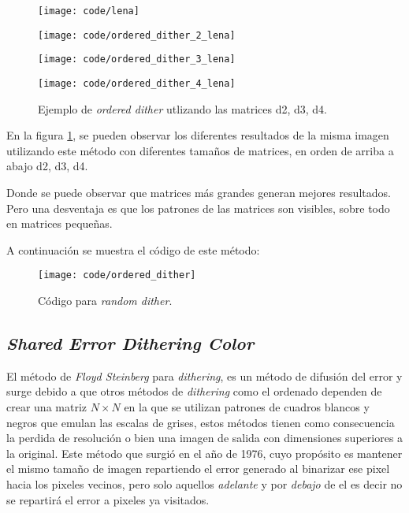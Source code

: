 \documentclass[conference]{IEEEtran}
\begin{document}
\begin{figure}[htbp]
\centerline{\texttt{[image: code/lena]}}
\centerline{\texttt{[image: code/ordered\_dither\_2\_lena]}}
\centerline{\texttt{[image: code/ordered\_dither\_3\_lena]}}
\centerline{\texttt{[image: code/ordered\_dither\_4\_lena]}}
\caption{Ejemplo de \textit{ordered dither} utlizando las matrices d2, d3, d4.}
\label{ordered}
\end{figure}

En la figura \ref{ordered}, se pueden observar los diferentes resultados de la misma imagen utilizando este método con diferentes tamaños de matrices, en orden de arriba a abajo d2, d3, d4.

Donde se puede observar que matrices más grandes generan mejores resultados. Pero una desventaja es que los patrones de las matrices son visibles, sobre todo en matrices pequeñas.

A continuación se muestra el código de este método:

\begin{figure}[htbp]
\centerline{\texttt{[image: code/ordered\_dither]}}
\caption{Código para \textit{random dither}.}
\label{orderedPy}
\end{figure}

\subsection{\textit{Shared Error Dithering Color}}
El método de \textit{Floyd Steinberg} para \textit{dithering}, es un método de difusión del error
y surge debido a que otros métodos de \textit{dithering} como el ordenado dependen de crear 
una matriz $N\times N$ en la que se utilizan patrones de cuadros blancos y negros que 
emulan las escalas de grises, estos métodos tienen como consecuencia la perdida 
de resolución o bien una imagen de salida con dimensiones superiores a la original.
Este método que surgió en el año de 1976, cuyo propósito es mantener el mismo tamaño de imagen repartiendo el error generado al binarizar ese pixel hacia los pixeles vecinos, pero solo aquellos
\textit{adelante} y por \textit{debajo} de el es decir no se repartirá el error a pixeles ya visitados.

\end{document}

